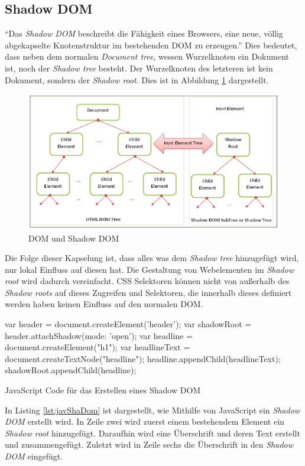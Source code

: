 \documentclass[12pt, paper=a4, bibtotoc, toc=listof]{scrreprt}
\begin{document}
			\subsection{Shadow DOM}
			\enquote{Das \emph{Shadow \ac{DOM}} beschreibt die Fähigkeit eines Browsers, eine neue, völlig abgekapselte Knotenstruktur im bestehenden \ac{DOM} zu erzeugen.} Dies bedeutet, dass neben dem normalen \emph{Document tree}, wessen Wurzelknoten ein Dokument ist, noch der \emph{Shadow tree} besteht. Der Wurzelknoten des letzteren ist kein Dokument, sondern der \emph{Shadow root}. Dies ist in Abbildung \ref{img:shaDom} dargestellt. 
			\begin{figure}[ht]
				\centering
				\includegraphics{shaDom.png}
				\caption{DOM und Shadow \ac{DOM} }
				\label{img:shaDom}
			\end{figure}
			Die Folge dieser Kapselung ist, dass alles was dem \emph{Shadow tree} hinzugefügt wird, nur lokal Einfluss auf diesen hat. Die Gestaltung von Webelementen im \emph{Shadow root} wird dadurch vereinfacht.
			\ac{CSS} Selektoren können nicht von außerhalb des \emph{Shadow roots} auf dieses Zugreifen und Selektoren, die innerhalb dieses definiert werden haben keinen Einfluss auf den normalen \ac{DOM}.
			\begin{listing}
				\begin{JavaScriptcode*}{}
var header = document.createElement('header');
var shadowRoot = header.attachShadow({mode: 'open'});
var headline = document.createElement("h1");
var headlineText = document.createTextNode("headline");
headline.appendChild(headlineText);
shadowRoot.appendChild(headline);
					
				\end{JavaScriptcode*}
				\caption{JavaScript Code für das Erstellen eines Shadow DOM}
				\label{lst:javShaDom}
			\end{listing}
			In Listing \ref{lst:javShaDom} ist dargestellt, wie Mithilfe von JavaScript ein \emph{Shadow \ac{DOM}} erstellt wird. In Zeile zwei wird zuerst einem bestehendem Element ein \emph{Shadow root} hinzugefügt. Daraufhin wird eine Überschrift und deren Text erstellt und zusammengefügt. Zuletzt wird in Zeile sechs die Überschrift in den \emph{Shadow \ac{DOM}} eingefügt.
\end{document}
